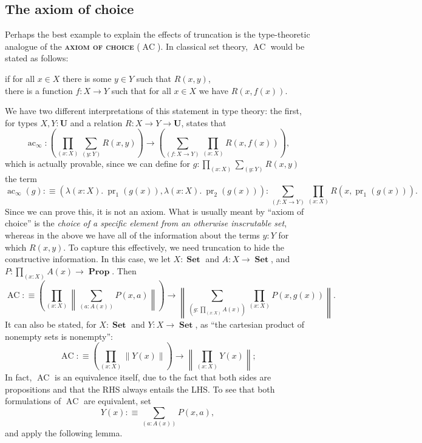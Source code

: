 \documentclass{article}
\newcommand{\defn}[1]{{\scshape\bfseries\color{MPBemph}#1}}
\newcommand{\eql}{\mathbin{:\equiv}}
\newcommand{\U}{\mathbf{U}}
\newcommand{\tpi}[1]{\prod_{(#1)}}
\newcommand{\tsigma}[1]{\sum_{(#1)}}
\DeclareMathOperator{\pr}{pr}
\newcommand{\1}{\textbf{1}}
\newcommand{\0}{\mathbf{0}}
\newcommand{\2}{\textbf{2}}
\newcommand{\norm}[1][\cdot]{\left\|#1\right\|}
\DeclareMathOperator{\Prop}{\textbf{Prop}}
\DeclareMathOperator{\Set}{\textbf{Set}}
\DeclareMathOperator{\AC}{AC}
\begin{document}
\subsection{The axiom of choice}
Perhaps the best example to explain the effects of truncation is the type-theoretic analogue of the \defn{axiom of choice} (\( \AC \)). In classical set theory, \( \AC \) would be stated as follows:
\begin{center}
	if for all \( x \in X \) there is some \( y \in Y \) such that \( R(x, y) \), \\
	there is a function \( f : X \to Y \) such that for all \( x \in X \) we have \( R(x, f(x)) \).
\end{center}
We have two different interpretations of this statement in type theory: the first, for types \( X, Y : \U \) and a relation \( R : X \to Y \to \U \), states that
\[ \operatorname{ac}_{\infty} : \left(\tpi{x : X} \tsigma{y : Y} R(x, y)\right) \to \left(\tsigma{f : X \to Y} \tpi{x : X} R(x, f(x))\right), \]
which is actually provable, since we can define for \( g : \tpi{x : X} \tsigma{y : Y} R(x, y) \) the term
\[ \operatorname{ac}_{\infty}(g) \eql (\lambda(x : X).~\pr_{1}(g(x)), \lambda(x : X).~\pr_{2}(g(x))) : \tsigma{f : X \to Y} \tpi{x : X} R(x, \pr_{1}(g(x))). \]
Since we can prove this, it is not an axiom. What is usually meant by ``axiom of choice'' is the \emph{choice of a specific element from an otherwise inscrutable set}, whereas in the above we have all of the information about the terms \( y : Y \) for which \( R(x, y) \). To capture this effectively, we need truncation to hide the constructive information. In this case, we let \( X : \Set \) and \( A : X \to \Set \), and \( P : \tpi{x : X} A(x) \to \Prop \). Then
\[ {\AC} \eql \left(\tpi{x : X} \norm[\tsigma{a : A(x)} P(x, a)]\right) \to \norm[\tsigma{g : \tpi{x : X} A(x)} \tpi{x : X} P(x, g(x))]. \]
It can also be stated, for \( X : \Set \) and \( Y : X \to \Set \), as ``the cartesian product of nonempty sets is nonempty'':
\[ {\AC} \eql \left(\tpi{x : X} \norm[Y(x)]\right) \to \norm[\tpi{x : X} Y(x)]; \]
In fact, \( \AC \) is an equivalence itself, due to the fact that both sides are propositions and that the RHS always entails the LHS. To see that both formulations of \( \AC \) are equivalent, set
\[ Y(x) \eql \tsigma{a : A(x)} P(x, a), \]
and apply the following lemma.
\end{document}
